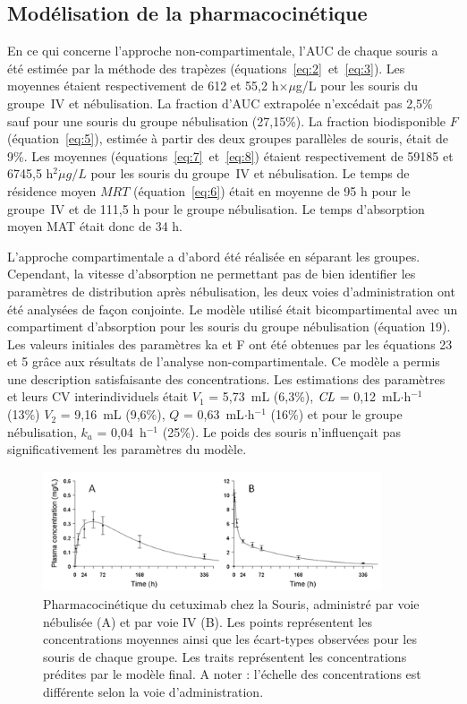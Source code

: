 \subsection{Modélisation de la pharmacocinétique}
En ce qui concerne l'approche non-compartimentale, l'\gls{AUC} de chaque souris a été estimée par la méthode des trapèzes (équations~\ref{eq:2}~et~\ref{eq:3}). Les moyennes étaient respectivement de 612 et 55,2 h$\times \mu$g/L pour les souris du groupe~IV et nébulisation. La fraction d'\gls{AUC} extrapolée n'excédait pas 2,5\% sauf pour une souris du groupe nébulisation (27,15\%). La fraction biodisponible $F$ (équation~\ref{eq:5}), estimée à partir des deux groupes parallèles de souris, était de 9\%. Les moyennes (équations~\ref{eq:7}~et~\ref{eq:8}) étaient respectivement de 59185 et 6745,5 h$^2\dot \mu g/L$ pour les souris du groupe~IV et nébulisation. Le temps de résidence moyen $MRT$ (équation~\ref{eq:6}) était en moyenne de 95 h pour le groupe~IV et de 111,5 h pour le groupe nébulisation. Le temps d'absorption moyen MAT était donc de 34 h. 

L'approche compartimentale a d'abord été réalisée en séparant les groupes. Cependant, la vitesse d'absorption ne permettant pas de bien identifier les paramètres de distribution après nébulisation, les deux voies d'administration ont été analysées de façon conjointe. Le modèle utilisé était bicompartimental avec un compartiment d'absorption pour les souris du groupe nébulisation (équation 19). Les valeurs initiales des paramètres ka et F ont été obtenues par les équations 23 et 5 grâce aux résultats de l'analyse non-compartimentale. Ce modèle a permis une description satisfaisante des concentrations. Les estimations des paramètres et leurs CV interindividuels était $V_1$ = 5,73~mL (6,3\%), $\operatorname{\textit{CL}}$ = 0,12~mL$\cdot$h$^{-1}$ (13\%) $V_2$ = 9,16~mL (9,6\%), $Q$ = 0,63~mL$\cdot$h$^{-1}$ (16\%) et pour le groupe nébulisation, $k_a$ = 0,04~h$^{-1}$ (25\%). Le poids des souris n'influençait pas significativement les paramètres du modèle.
\begin{figure}[htbp]
	\centering
		\includegraphics[width=10cm]{figures/raster/FIG_33}
	\caption{Pharmacocinétique du cetuximab chez la Souris, administré par voie nébulisée (A) et par voie IV (B). Les points représentent les concentrations moyennes ainsi que les écart-types observées pour les souris de chaque groupe. Les traits représentent les concentrations prédites par le modèle final. A noter : l'échelle des concentrations est différente selon la voie d'administration.}
	\label{fig:33}
\end{figure}

